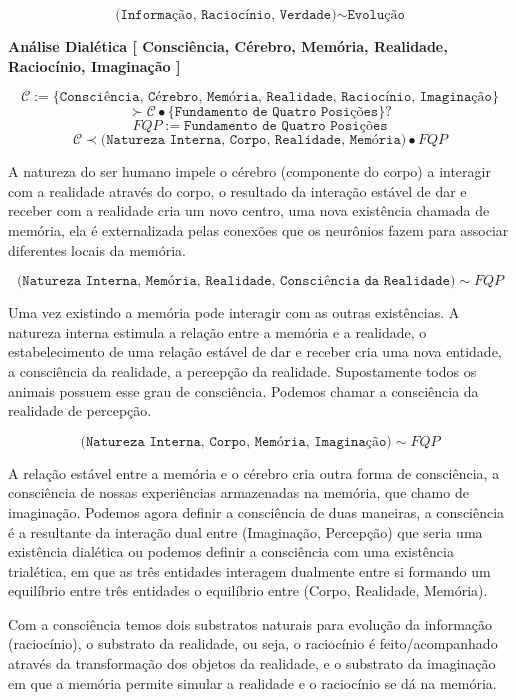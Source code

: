 $$ \texttt{(Informação, Raciocínio, Verdade)} \sim \texttt{Evolução} $$


\textbf{Análise Dialética [ Consciência, Cérebro, Memória, Realidade, Raciocínio, Imaginação ]}

$$ \mathcal{C} := \{ \texttt{Consciência, Cérebro, Memória, Realidade, Raciocínio, Imaginação} \} $$
$$  \succ \mathcal{C} \bullet \{ \texttt{Fundamento de Quatro Posições} \} ? $$
$$ FQP := \texttt{Fundamento de Quatro Posições} $$
$$ \mathcal{C} \prec \texttt{(Natureza Interna, Corpo, Realidade, Memória)} \bullet FQP $$
\hrulefill

A natureza do ser humano impele o cérebro (componente do corpo) a interagir com a realidade através do corpo, o resultado da interação estável de dar e receber com a realidade cria um novo centro, uma nova existência chamada de memória, ela é externalizada pelas conexões que os neurônios fazem para associar diferentes locais da memória.

$$ \texttt{(Natureza Interna, Memória, Realidade, Consciência da Realidade)} \sim FQP $$

\hrulefill

Uma vez existindo a memória pode interagir com as outras existências. A natureza interna estimula a relação entre a memória e a realidade, o estabelecimento de uma relação estável de dar e receber cria uma nova entidade, a consciência da realidade, a percepção da realidade. Supostamente todos os animais possuem esse grau de consciência. Podemos chamar a consciência da realidade de percepção.

$$ \texttt{(Natureza Interna, Corpo, Memória, Imaginação)} \sim FQP $$

\hrulefill 

A relação estável entre a memória e o cérebro cria outra forma de consciência, a consciência de nossas experiências armazenadas na memória, que chamo de imaginação. Podemos agora definir a consciência de duas maneiras, a consciência é a resultante da interação dual entre (Imaginação, Percepção) que seria uma existência dialética ou podemos definir a consciência com uma existência trialética, em que as três entidades interagem dualmente entre si formando um equilíbrio entre três entidades o equilíbrio entre (Corpo, Realidade, Memória).

Com a consciência temos dois substratos naturais para evolução da informação (raciocínio), o substrato da realidade, ou seja, o raciocínio é feito/acompanhado através da transformação dos objetos da realidade, e o substrato da imaginação em que a memória permite simular a realidade e o raciocínio se dá na memória.

